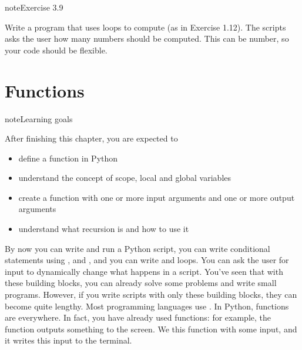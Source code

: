 \documentclass[letterpaper,10pt,english]{jupyterBook}
\begin{document}
\begin{sphinxadmonition}{note}{Exercise 3.9}

\sphinxAtStartPar
Write a program that uses loops to compute  (as in Exercise 1.12). The scripts asks the user how many numbers should be computed. This can be  number, so your code should be flexible.
\end{sphinxadmonition}

\sphinxstepscope


\chapter{Functions}
\label{\detokenize{notebooks/04_Functions/04_Functions_student:functions}}\label{\detokenize{notebooks/04_Functions/04_Functions_student::doc}}
\begin{sphinxadmonition}{note}{Learning goals}

\sphinxAtStartPar
After finishing this chapter, you are expected to
\begin{itemize}
\item {} 
\sphinxAtStartPar
define a function in Python

\item {} 
\sphinxAtStartPar
understand the concept of scope, local and global variables

\item {} 
\sphinxAtStartPar
create a function with one or more input arguments and one or more output arguments

\item {} 
\sphinxAtStartPar
understand what recursion is and how to use it

\end{itemize}
\end{sphinxadmonition}

\sphinxAtStartPar
By now you can write and run a Python script, you can write conditional statements using ,  and , and you can write  and  loops. You can ask the user for input to dynamically change what happens in a script. You’ve seen that with these building blocks, you can already solve some problems and write small programs. However, if you write scripts with only these building blocks, they can become quite lengthy. Most programming languages use . In Python, functions are everywhere. In fact, you have already used functions: for example, the  function outputs something to the screen. We  this function with some input, and it writes this input to the terminal.
\end{document}

